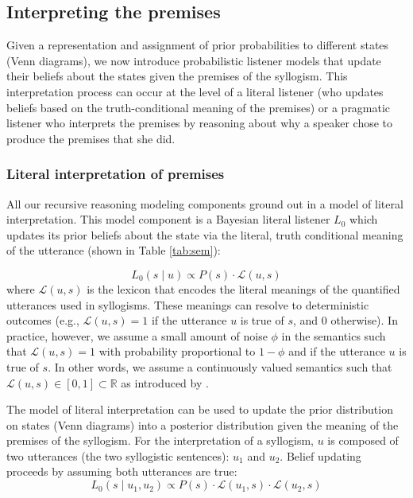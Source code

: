 \documentclass[floatsintext, doc]{apa6}
\begin{document}
\subsection{Interpreting the premises}

Given a representation and assignment of prior probabilities to different states (Venn diagrams), we now introduce probabilistic listener models that update their beliefs about the states given the premises of the syllogism. 
This interpretation process can occur at the level of a literal listener (who updates beliefs based on the truth-conditional meaning of the premises) or a pragmatic listener who interprets the premises by reasoning about why a speaker chose to produce the premises that she did. 

\subsubsection{Literal interpretation of premises}

All our recursive reasoning modeling components ground out in a model of literal interpretation.
This model component is a Bayesian literal listener $L_0$ which updates its prior beliefs about the state via the literal, truth conditional meaning of the utterance (shown in Table \ref{tab:sem}):

\begin{equation}
L_0(s \mid u ) \propto P(s)\cdot \mathcal{L}(u, s) 
\label{eq:L0}
\end{equation}
\noindent where $\mathcal{L}(u, s)$ is the lexicon that encodes the literal meanings of the quantified utterances used in syllogisms. 
These meanings can resolve to deterministic outcomes (e.g., $\mathcal{L}(u, s) = 1$ if the utterance $u$ is true of $s$, and 0 otherwise). 
In practice, however, we assume a small amount of noise $\phi$ in the semantics such that $\mathcal{L}(u, s) = 1$ with probability proportional to $1-\phi$ and if the utterance $u$ is true of $s$.
In other words, we assume a continuously valued semantics such that $\mathcal{L}(u, s) \in [0, 1] \subset \mathbb{R}$ as introduced by .

The model of literal interpretation can be used to update the prior distribution on states (Venn diagrams) into a posterior distribution given the meaning of the premises of the syllogism. 
For the interpretation of a syllogism, $u$ is composed of two utterances (the two syllogistic sentences): $u_1$ and $u_2$. 
Belief updating proceeds by assuming both utterances are true: 
\begin{equation}
L_0(s \mid u_1,  u_2) \propto P(s)\cdot \mathcal{L}(u_1, s) \cdot \mathcal{L}(u_2, s) 
\label{eq:L0premises}
\end{equation}
\end{document}
